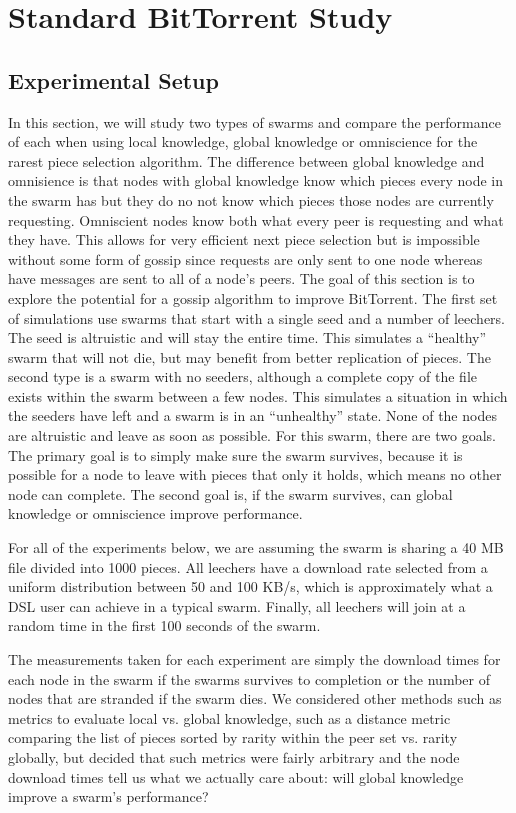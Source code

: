 \section{Standard BitTorrent Study}

\subsection{Experimental Setup}

In this section, we will study two types of swarms and compare the
performance of each when using local knowledge, global knowledge or 
omniscience for the rarest piece selection algorithm. The difference
between global knowledge and omnisience is that nodes with global
knowledge know which pieces every node in the swarm has but they do
no not know which pieces those nodes are currently
requesting. Omniscient nodes know both what every peer is requesting
and what they have. This allows for very efficient next piece
selection but is impossible without some form of gossip since requests
are only sent to one node whereas have messages are sent to all of a
node's peers. The goal of this section is to explore the potential for
a gossip algorithm to improve BitTorrent. The first set of simulations
use swarms that start with a single seed and a number of leechers.
The seed is altruistic and will stay the entire time. This 
simulates a ``healthy'' swarm that will not die, but may benefit from 
better replication of pieces. The second type is a swarm with no seeders, 
although a complete copy of the file exists within the swarm between a
few nodes. This simulates a situation in which the seeders have left
and a swarm is in an ``unhealthy'' state. None of the nodes are
altruistic and leave as soon as possible. For this swarm,
there are two goals. The primary goal is to simply make sure the swarm
survives, because it is possible for a node to leave with pieces that
only it holds, which means no other node can complete. The second goal
is, if the swarm survives, can global knowledge or omniscience improve 
performance.

For all of the experiments below, we are assuming the swarm is sharing a
40 MB file divided into 1000 pieces. All leechers have a download rate
selected from a uniform distribution between 50 and 100 KB/s, which is
approximately what a DSL user can achieve in a typical swarm. Finally, all
leechers will join at a random time in the first 100 seconds of the swarm.

The measurements taken for each experiment are simply the download times for
each node in the swarm if the swarms survives to completion or the
number of nodes that are stranded if the swarm dies. We considered
other methods such as metrics to evaluate local vs. global knowledge,
such as a distance metric comparing the list of pieces sorted by
rarity within the peer set vs. rarity globally, but decided that such
metrics were fairly arbitrary and the node download times tell us
what we actually care about: will global knowledge improve a swarm's
performance?


